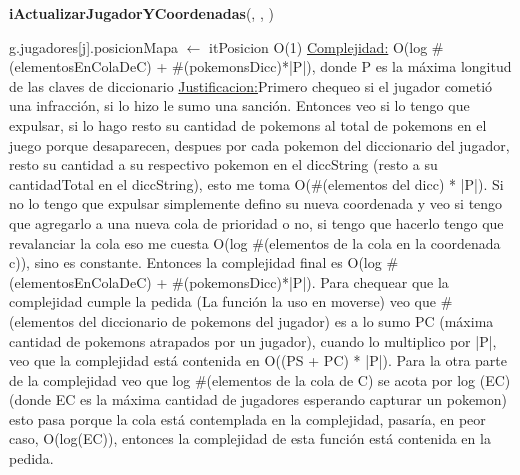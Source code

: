 \begin{Algoritmos}
\begin{algorithm}[H]{\textbf{iActualizarJugadorYCoordenadas}(, , )}
\begin{algorithmic}[1]
\begin{scriptsize}
			\State g.jugadores[j].posicionMapa $\gets$ itPosicion \Comment O(1)			
		\EndIf
		\medskip
		\Statex \underline{Complejidad:} O(log $\#$(elementosEnColaDeC) + $\#$(pokemonsDicc)*|P|), donde P es la máxima longitud de las claves de diccionario
		\Statex \underline{Justificacion:}Primero chequeo si el jugador cometió una infracción, si lo hizo le sumo una sanción. Entonces veo si lo tengo que expulsar, si lo hago resto su cantidad de pokemons al total de pokemons en el juego porque desaparecen, despues por cada pokemon del diccionario del jugador, resto su cantidad a su respectivo pokemon en el diccString (resto a su cantidadTotal en el diccString), esto me toma O($\#$(elementos del dicc) * |P|). Si no lo tengo que expulsar simplemente defino su nueva coordenada y veo si tengo que agregarlo a una nueva cola de prioridad o no, si tengo que hacerlo tengo que revalanciar la cola eso me cuesta O(log $\#$(elementos de la cola en la coordenada c)), sino es constante. Entonces la complejidad final es O(log $\#$(elementosEnColaDeC) + $\#$(pokemonsDicc)*|P|). Para chequear que la complejidad cumple la pedida (La función la uso en moverse) veo que $\#$(elementos del diccionario de pokemons del jugador) es a lo sumo PC (máxima cantidad de pokemons atrapados por un jugador), cuando lo multiplico por |P|, veo que la complejidad está contenida en O((PS + PC) * |P|). Para la otra parte de la complejidad veo que log $\#$(elementos de la cola de C) se acota por log (EC) (donde EC es la máxima cantidad de jugadores esperando capturar un pokemon) esto pasa porque la cola está contemplada en la complejidad, pasaría, en peor caso, O(log(EC)), entonces la complejidad de esta función está contenida en la pedida.
		\end{scriptsize}
	\end{algorithmic}
\end{algorithm}


\end{Algoritmos}
